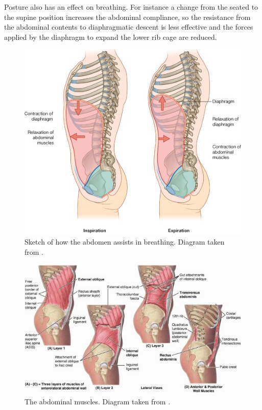 Posture also has an effect on breathing. For instance a change from the seated to the supine position increases the abdominal compliance, so the resistance from the abdominal contents to diaphragmatic descent is less effective and the forces applied by the diaphragm to expand the lower rib cage are reduced.

\begin{figure}
	\centering
	 \includegraphics[scale=0.6]{pics/inspiration_expiration_diaphragm}
	 \caption[Sketch of how the abdomen assists in breathing]{\label{fig:inspiration_expiration_diaphragm}Sketch of how the abdomen assists in breathing. Diagram taken from \cite{drake2005gray}.}	
\end{figure}

\begin{figure}
	\centering
	 \includegraphics[scale=0.6]{pics/abdominal_muscles}
	\caption[The abdominal muscles]{\label{fig:abdominal_muscles}The abdominal muscles. Diagram taken from \cite{moore1992clinically}.}	
\end{figure}

